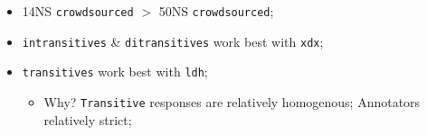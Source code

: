 \documentclass[xcolor={dvipsnames}]{beamer}
\newcommand{\param}[1]{\texttt{#1}}
\begin{document}
\begin{frame}
\begin{itemize}
\pause
\item 14NS \param{crowdsourced} $>$ 50NS \param{crowdsourced};
\pause
\item \param{intransitives} \& \param{ditransitives} work best with \param{xdx};
\pause
\item \param{transitives} work best with \param{ldh};
\begin{itemize}
\pause
\item Why? \param{Transitive} responses are relatively homogenous; Annotators relatively strict;
\end{itemize}
\end{itemize}

\end{frame}

\end{document}
